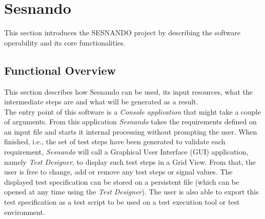 \chapter{Sesnando}
\label{ch:sesnando}

This section introduces the SESNANDO project by describing the software operability and its core functionalities.

\section{Functional Overview}
\label{sec:functional_overview}

This section describes how Sesnando can be used, its input resources, what the intermediate steps are and what will be generated as a result.\\
The entry point of this software is a \textit{Console application} that might take a couple of arguments. From this application \textit{Sesnando} takes the requirements defined on an input file and starts it internal processing without prompting the user. When finished, i.e., the set of test steps have been generated to validate each requirement, \textit{Sesnando} will call a Graphical User Interface (GUI) application, namely \textit{Test Designer}, to display such test steps in a Grid View. From that, the user is free to change, add or remove any test steps or signal values. The displayed test specification can be stored on a persistent file (which can be opened at any time using the \textit{Test Designer}). The user is also able to export this test specification as a test script to be used on a test execution tool or test environment.\\

